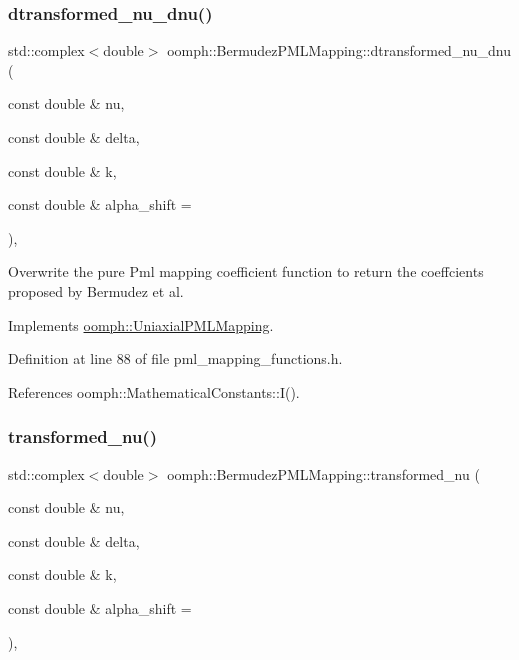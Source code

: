 \subsubsection{\texorpdfstring{dtransformed\+\_\+nu\+\_\+dnu()}{dtransformed\_nu\_dnu()}}
{\footnotesize\ttfamily std\+::complex$<$double$>$ oomph\+::\+Bermudez\+P\+M\+L\+Mapping\+::dtransformed\+\_\+nu\+\_\+dnu (\begin{DoxyParamCaption}\item[{const double \&}]{nu,  }\item[{const double \&}]{delta,  }\item[{const double \&}]{k,  }\item[{const double \&}]{alpha\+\_\+shift = {} }\end{DoxyParamCaption})\hspace{0.3cm}{\ttfamily [inline]}, {\ttfamily [virtual]}}



Overwrite the pure Pml mapping coefficient function to return the coeffcients proposed by Bermudez et al. 



Implements \hyperlink{classoomph_1_1UniaxialPMLMapping_a2062b54207f13512fd3d9b901c882d44}{oomph\+::\+Uniaxial\+P\+M\+L\+Mapping}.



Definition at line 88 of file pml\+\_\+mapping\+\_\+functions.\+h.



References oomph\+::\+Mathematical\+Constants\+::\+I().

\mbox{\label{classoomph_1_1BermudezPMLMapping_a668c619f65e0570fdf97e0e24026593e}} 
\subsubsection{\texorpdfstring{transformed\+\_\+nu()}{transformed\_nu()}}
{\footnotesize\ttfamily std\+::complex$<$double$>$ oomph\+::\+Bermudez\+P\+M\+L\+Mapping\+::transformed\+\_\+nu (\begin{DoxyParamCaption}\item[{const double \&}]{nu,  }\item[{const double \&}]{delta,  }\item[{const double \&}]{k,  }\item[{const double \&}]{alpha\+\_\+shift = {} }\end{DoxyParamCaption})\hspace{0.3cm}{\ttfamily [inline]}, {\ttfamily [virtual]}}



